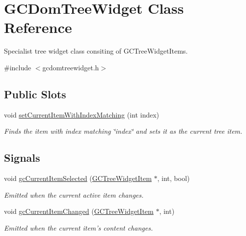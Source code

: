 \hypertarget{class_g_c_dom_tree_widget}{\section{\-G\-C\-Dom\-Tree\-Widget \-Class \-Reference}
\label{class_g_c_dom_tree_widget}
}


\-Specialist tree widget class consiting of \-G\-C\-Tree\-Widget\-Items.  




{\ttfamily \#include $<$gcdomtreewidget.\-h$>$}

\subsection*{\-Public \-Slots}
\begin{DoxyCompactItemize}
\item 
void \hyperlink{class_g_c_dom_tree_widget_ab9178aca10757ba7b7cef489171fb725}{set\-Current\-Item\-With\-Index\-Matching} (int index)
\begin{DoxyCompactList}\small\item\em \-Finds the item with index matching \char`\"{}index\char`\"{} and sets it as the current tree item. \end{DoxyCompactList}\end{DoxyCompactItemize}
\subsection*{\-Signals}
\begin{DoxyCompactItemize}
\item 
void \hyperlink{class_g_c_dom_tree_widget_aa4aaa06b56ebf5500fd41253144bd6fd}{gc\-Current\-Item\-Selected} (\hyperlink{class_g_c_tree_widget_item}{\-G\-C\-Tree\-Widget\-Item} $\ast$, int, bool)
\begin{DoxyCompactList}\small\item\em \-Emitted when the current active item changes. \end{DoxyCompactList}\item 
void \hyperlink{class_g_c_dom_tree_widget_a20238112d91ad7a05e9a762ce2a51589}{gc\-Current\-Item\-Changed} (\hyperlink{class_g_c_tree_widget_item}{\-G\-C\-Tree\-Widget\-Item} $\ast$, int)
\begin{DoxyCompactList}\small\item\em \-Emitted when the current item's content changes. \end{DoxyCompactList}\end{DoxyCompactItemize}
